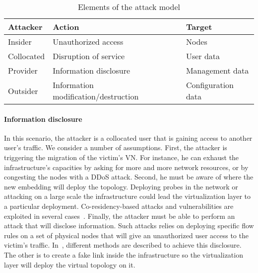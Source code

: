 
\begin{table}[h]
\centering
\begin{tabular}{|l|l|l|}
\hline
\textbf{Attacker}   & \textbf{Action}    & \textbf{Target}             \\ \hline
Insider    & Unauthorized access                  & Nodes              \\ \hline
Collocated & Disruption of service                & User data          \\ \hline
Provider   & Information disclosure               & Management data    \\ \hline
Outsider   & Information modification/destruction & Configuration data \\ \hline
\end{tabular}
\caption{Elements of the attack model}
\label{tab:attack-model}
\end{table}

\paragraph{Information disclosure} In this scenario, the attacker is a collocated user that is gaining access to another user's traffic. 
We consider a number of assumptions. 
First, the attacker is triggering the migration of the victim's VN.
For instance, he can exhaust the infrastructure's capacities by asking for more and more network resources, or by congesting the nodes with a DDoS attack.
Second, he must be aware of where the new embedding will deploy the topology. 
Deploying probes in the network or attacking on a large scale the infrastructure could lead the virtualization layer to a particular deployment.
Co-residency-based attacks and vulnerabilities are exploited in several cases~\cite{malicious-atya2017,nomad-Moon2015b,getoffmucloud-Ristenpart2009,stalling-atya2017}.
Finally, the attacker must be able to perform an attack that will disclose information.
Such attacks relies on deploying specific flow rules on a set of physical nodes that will give an unauthorized user access to the victim's traffic.
In~\cite{Costa2015,Sphinx-Dhawan2015}, different methods are described to achieve this disclosure. 
The other is to create a fake link inside the infrastructure so the virtualization layer will deploy the virtual topology on it. 

